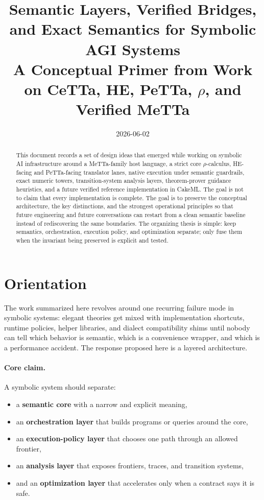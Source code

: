 \documentclass[11pt]{article}
\title{Semantic Layers, Verified Bridges, and Exact Semantics for Symbolic AGI Systems\\
\large A Conceptual Primer from Work on CeTTa, HE, PeTTa, \texorpdfstring{$\rho$}{rho}, and Verified MeTTa}
\author{}
\date{2026-06-02}
\begin{document}
\maketitle

\begin{abstract}
This document records a set of design ideas that emerged while working on symbolic AI infrastructure around a MeTTa-family host language, a strict core $\rho$-calculus, HE-facing and PeTTa-facing translator lanes, native execution under semantic guardrails, exact numeric towers, transition-system analysis layers, theorem-prover guidance heuristics, and a future verified reference implementation in CakeML. The goal is not to claim that every implementation is complete. The goal is to preserve the conceptual architecture, the key distinctions, and the strongest operational principles so that future engineering and future conversations can restart from a clean semantic baseline instead of rediscovering the same boundaries. The organizing thesis is simple: keep semantics, orchestration, execution policy, and optimization separate; only fuse them when the invariant being preserved is explicit and tested.
\end{abstract}

\section{Orientation}

The work summarized here revolves around one recurring failure mode in symbolic systems: elegant theories get mixed with implementation shortcuts, runtime policies, helper libraries, and dialect compatibility shims until nobody can tell which behavior is semantic, which is a convenience wrapper, and which is a performance accident. The response proposed here is a layered architecture.

\paragraph{Core claim.}
A symbolic system should separate:
\begin{itemize}
    \item a \textbf{semantic core} with a narrow and explicit meaning,
    \item an \textbf{orchestration layer} that builds programs or queries around the core,
    \item an \textbf{execution-policy layer} that chooses one path through an allowed frontier,
    \item an \textbf{analysis layer} that exposes frontiers, traces, and transition systems,
    \item and an \textbf{optimization layer} that accelerates only when a contract says it is safe.
\end{itemize}
\end{document}

